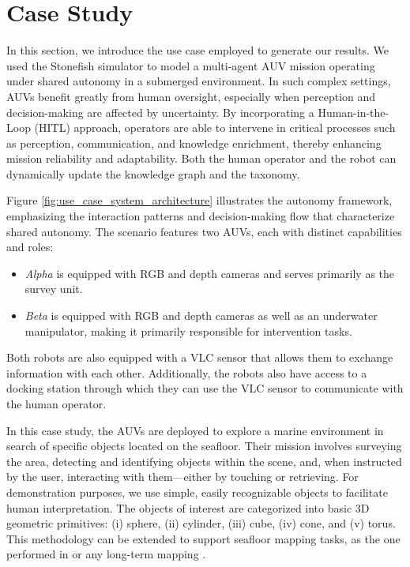 


\section{Case Study}\label{sec:sim}
In this section, we introduce the use case employed to generate our results. We used the Stonefish simulator \cite{cieslak2019stonefish, grimaldi2025stonefishsupportingmachinelearning} to model a multi-agent AUV mission operating under shared autonomy in a submerged environment. In such complex settings, AUVs benefit greatly from human oversight, especially when perception and decision-making are affected by uncertainty. By incorporating a Human-in-the-Loop (HITL) approach, operators are able to intervene in critical processes such as perception, communication, and knowledge enrichment, thereby enhancing mission reliability and adaptability. Both the human operator and the robot can dynamically update the knowledge graph and the taxonomy.

Figure \ref{fig:use_case_system_architecture} illustrates the autonomy framework, emphasizing the interaction patterns and decision-making flow that characterize shared autonomy. The scenario features two AUVs, each with distinct capabilities and roles:
\begin{itemize}
\item \emph{Alpha} is equipped with RGB and depth cameras and serves primarily as the survey unit.
\item \emph{Beta} is equipped with RGB and depth cameras as well as an underwater manipulator, making it primarily responsible for intervention tasks.
\end{itemize}

\noindent Both robots are also equipped with a VLC sensor that allows them to exchange information with each other. Additionally, the robots also have access to a docking station through which they can use the VLC sensor to communicate with the human operator.  

In this case study, the AUVs are deployed to explore a marine environment in search of specific objects located on the seafloor. Their mission involves surveying the area, detecting and identifying objects within the scene, and, when instructed by the user, interacting with them—either by touching or retrieving. For demonstration purposes, we use simple, easily recognizable objects to facilitate human interpretation. The objects of interest are categorized into basic 3D geometric primitives: (i) sphere, (ii) cylinder, (iii) cube, (iv) cone, and (v) torus. This methodology can be extended to support seafloor mapping tasks, as the one performed in \cite{grimaldi2025realtimeseafloorsegmentationmapping} or any long-term mapping \cite{grimaldi2024fragg}.

